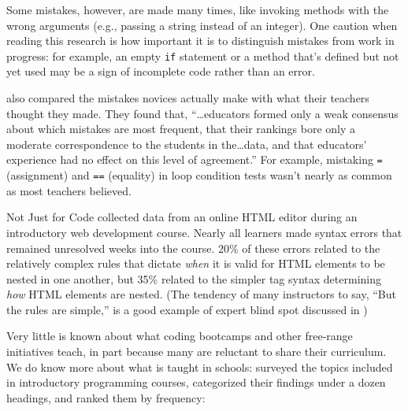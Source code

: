 Some mistakes, however, are made many times, like invoking methods with
the wrong arguments (e.g., passing a string instead of an integer). One
caution when reading this research is how important it is to distinguish
mistakes from work in progress: for example, an empty \texttt{if} statement or
a method that's defined but not yet used may be a sign of incomplete
code rather than an error.

\cite{Brow2017} also compared the mistakes novices actually make with
what their teachers thought they made. They found that,
``{\ldots}educators formed only a weak consensus about which
mistakes are most frequent, that their rankings bore only a moderate
correspondence to the students in the{\ldots}data, and that
educators' experience had no effect on this level of agreement.'' For
example, mistaking \texttt{=} (assignment) and \texttt{==} (equality) in loop
condition tests wasn't nearly as common as most teachers believed.

\begin{aside}{Not Just for Code}
  \cite{Park2015} collected data from an online HTML editor during an
  introductory web development course. Nearly all learners made syntax
  errors that remained unresolved weeks into the course. 20\% of these
  errors related to the relatively complex rules that dictate \emph{when} it
  is valid for HTML elements to be nested in one another, but 35\%
  related to the simpler tag syntax determining \emph{how} HTML elements are
  nested. (The tendency of many instructors to say, ``But the rules are
  simple,'' is a good example of expert blind spot discussed in
  )
\end{aside}


Very little is known about what coding bootcamps and other free-range
initiatives teach, in part because many are reluctant to share their
curriculum. We do know more about what is taught in schools:
\cite{Luxt2017} surveyed the topics included in introductory
programming courses, categorized their findings under a dozen headings,
and ranked them by frequency:


